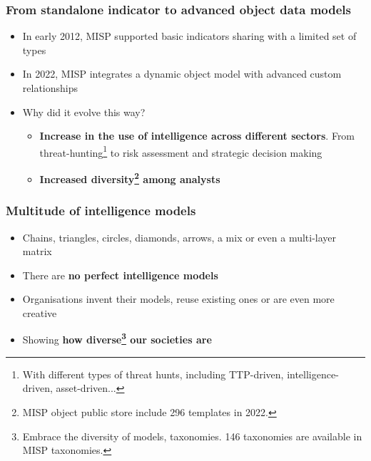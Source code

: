 \begin{frame}
  \frametitle{From standalone indicator to advanced object data models}
  \begin{itemize}
    \item In early 2012, MISP supported basic indicators sharing with a limited set of types
    \item In 2022, MISP integrates a dynamic object model with advanced custom relationships 
    \item Why did it evolve this way?
        \begin{itemize}
            \item {\bf Increase in the use of intelligence across different sectors}. From threat-hunting\footnote{With different types of threat hunts, including TTP-driven, intelligence-driven, asset-driven...} to risk assessment and strategic decision making
            \item {\bf Increased diversity\footnote{MISP object public store include 296 templates in 2022.} among analysts}
        \end{itemize}
  \end{itemize}
\end{frame}

\begin{frame}
  \frametitle{Multitude of intelligence models}
  \begin{itemize}
     \item Chains, triangles, circles, diamonds, arrows, a mix or even a multi-layer matrix
     \item There are {\bf no perfect intelligence models}
     \item Organisations invent their models, reuse existing ones or are even more creative
     \item Showing {\bf how diverse\footnote{Embrace the diversity of models, taxonomies. 146 taxonomies are available in MISP taxonomies.} our societies are}
  \end{itemize}
\end{frame}

